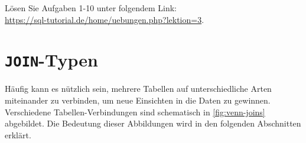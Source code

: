 \begin{myexercise}
Lösen Sie Aufgaben 1-10 unter folgendem Link:\\
\url{https://sql-tutorial.de/home/uebungen.php?lektion=3}.
\end{myexercise}

\section{\texorpdfstring{\lstinline[style=sql]|JOIN|-Typen}{JOIN-Typen}}


Häufig kann es nützlich sein, mehrere Tabellen auf unterschiedliche Arten miteinander zu verbinden, um neue Einsichten in die Daten zu gewinnen. Verschiedene Tabellen-Verbindungen sind schematisch in \cref{fig:venn-joins} abgebildet. Die Bedeutung dieser Abbildungen wird in den folgenden Abschnitten erklärt.


